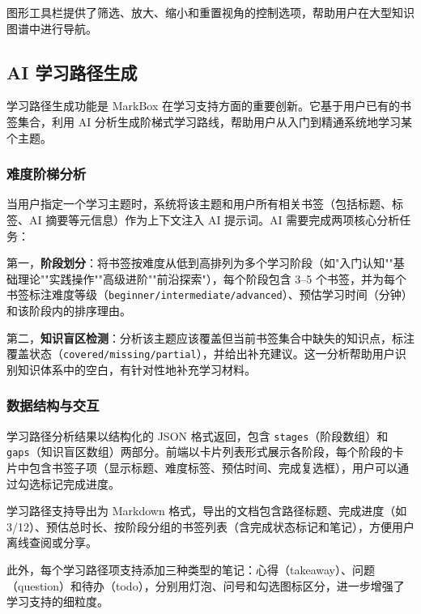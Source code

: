 \documentclass[12pt,a4paper]{ctexart}
\begin{document}
图形工具栏提供了筛选、放大、缩小和重置视角的控制选项，帮助用户在大型知识图谱中进行导航。


\subsection{AI 学习路径生成}

学习路径生成功能是 MarkBox 在学习支持方面的重要创新。它基于用户已有的书签集合，利用 AI 分析生成阶梯式学习路线，帮助用户从入门到精通系统地学习某个主题。

\subsubsection{难度阶梯分析}

当用户指定一个学习主题时，系统将该主题和用户所有相关书签（包括标题、标签、AI 摘要等元信息）作为上下文注入 AI 提示词。AI 需要完成两项核心分析任务：

第一，\textbf{阶段划分}：将书签按难度从低到高排列为多个学习阶段（如"入门认知""基础理论""实践操作""高级进阶""前沿探索"），每个阶段包含 3--5 个书签，并为每个书签标注难度等级（\texttt{beginner/intermediate/advanced}）、预估学习时间（分钟）和该阶段内的排序理由。

第二，\textbf{知识盲区检测}：分析该主题应该覆盖但当前书签集合中缺失的知识点，标注覆盖状态（\texttt{covered/missing/partial}），并给出补充建议。这一分析帮助用户识别知识体系中的空白，有针对性地补充学习材料。

\subsubsection{数据结构与交互}

学习路径分析结果以结构化的 JSON 格式返回，包含 \texttt{stages}（阶段数组）和 \texttt{gaps}（知识盲区数组）两部分。前端以卡片列表形式展示各阶段，每个阶段的卡片中包含书签子项（显示标题、难度标签、预估时间、完成复选框），用户可以通过勾选标记完成进度。

学习路径支持导出为 Markdown 格式，导出的文档包含路径标题、完成进度（如 3/12）、预估总时长、按阶段分组的书签列表（含完成状态标记和笔记），方便用户离线查阅或分享。

此外，每个学习路径项支持添加三种类型的笔记：心得（takeaway）、问题（question）和待办（todo），分别用灯泡、问号和勾选图标区分，进一步增强了学习支持的细粒度。
\end{document}
